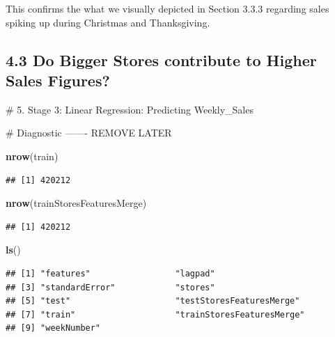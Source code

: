 \documentclass[]{article}
\newenvironment{Shaded}{\begin{snugshade}}{\end{snugshade}}
\newcommand{\KeywordTok}[1]{\textcolor[rgb]{0.13,0.29,0.53}{\textbf{{#1}}}}
\newcommand{\NormalTok}[1]{{#1}}
\begin{document}
This confirms the what we visually depicted in Section 3.3.3 regarding
sales spiking up during Christmas and Thanksgiving.

\pagebreak

\subsection{4.3 Do Bigger Stores contribute to Higher Sales
Figures?}\label{do-bigger-stores-contribute-to-higher-sales-figures}

\pagebreak
\# 5. Stage 3: Linear Regression: Predicting Weekly\_Sales

\pagebreak
\# Diagnostic ------- REMOVE LATER

\begin{Shaded}
\begin{Highlighting}[]
\KeywordTok{nrow}\NormalTok{(train)}
\end{Highlighting}
\end{Shaded}

\begin{verbatim}
## [1] 420212
\end{verbatim}

\begin{Shaded}
\begin{Highlighting}[]
\KeywordTok{nrow}\NormalTok{(trainStoresFeaturesMerge)}
\end{Highlighting}
\end{Shaded}

\begin{verbatim}
## [1] 420212
\end{verbatim}

\begin{Shaded}
\begin{Highlighting}[]
\KeywordTok{ls}\NormalTok{()}
\end{Highlighting}
\end{Shaded}

\begin{verbatim}
## [1] "features"                 "lagpad"                  
## [3] "standardError"            "stores"                  
## [5] "test"                     "testStoresFeaturesMerge" 
## [7] "train"                    "trainStoresFeaturesMerge"
## [9] "weekNumber"
\end{verbatim}
\end{document}
